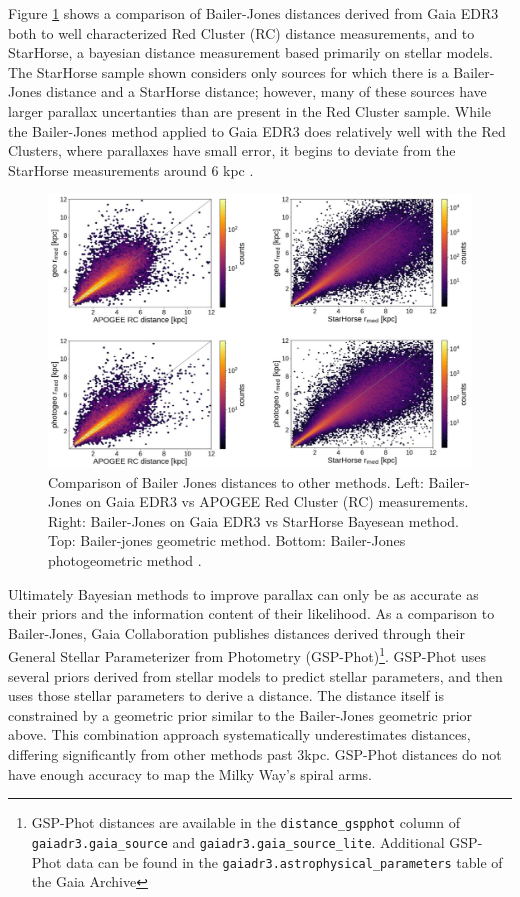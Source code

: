 \documentclass[twocolumn]{aastex631}
\begin{document}
Figure \ref{fig:bailerjones} shows a comparison of Bailer-Jones distances derived from Gaia EDR3 both to well characterized Red Cluster (RC) distance measurements, and to StarHorse, a bayesian distance measurement based primarily on stellar models\cite{queirozStarHorse2018}. The StarHorse sample shown considers only sources for which there is a Bailer-Jones distance and a StarHorse distance; however, many of these sources have larger parallax uncertanties than are present in the Red Cluster sample.  While the Bailer-Jones method applied to Gaia EDR3 does relatively well with the Red Clusters, where parallaxes have small error, it begins to deviate from the StarHorse measurements around 6 kpc \cite{bailer-jonesEstimating2021}. 
\begin{figure}
	\includegraphics[width=\columnwidth]{bailerjonesverification.png}
	\caption{Comparison of Bailer Jones distances to other methods. Left: Bailer-Jones on Gaia EDR3 vs APOGEE Red Cluster (RC) measurements. Right: Bailer-Jones on Gaia EDR3 vs StarHorse Bayesean method. Top: Bailer-jones geometric method. Bottom: Bailer-Jones photogeometric method \citep{bailer-jonesEstimating2021}.}
	\label{fig:bailerjones}
\end{figure}

Ultimately Bayesian methods to improve parallax can only be as accurate as their priors and the information content of their likelihood. As a comparison to Bailer-Jones, Gaia Collaboration publishes distances derived through their General Stellar Parameterizer from Photometry (GSP-Phot)\footnote{GSP-Phot distances are available in the \texttt{distance\_gspphot} column of \texttt{gaiadr3.gaia\_source} and \texttt{gaiadr3.gaia\_source\_lite}. Additional GSP-Phot data can be found in the \texttt{gaiadr3.astrophysical\_parameters} table of the Gaia Archive}. GSP-Phot uses several priors derived from stellar models to predict stellar parameters, and then uses those stellar parameters to derive a distance. The distance itself is constrained by a geometric prior similar to the Bailer-Jones geometric prior above. This combination approach systematically underestimates distances, differing significantly from other methods past 3kpc. GSP-Phot distances do not have enough accuracy to map the Milky Way's spiral arms\citep{andraeGaia2022}.
\end{document}
